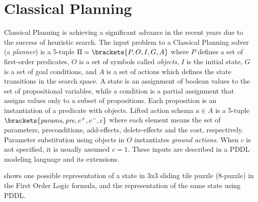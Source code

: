
\section{Classical Planning}

Classical Planning is achieving a significant advance in the recent years due to the success of heuristic search.
The input problem to a Classical Planning solver (a \emph{planner}) is a 5-tuple 
$\Pi=\brackets{P,O,I,G,A}$ where $P$ defines a set of first-order predicates, $O$ is a set of symbols called \emph{objects}, $I$ is the initial state, $G$ is a set of goal conditions, and $A$ is a set of actions which defines the state transitions in the search space.
A state is an assignment of boolean values to the set of propositional variables, while a condition is a partial assignment that assigns values only to a subset of propositions.
Each proposition is an instantiation of a predicate with objects.
% 
% 
Lifted action schema $a \in A$ is a 5-tuple
$\brackets{\mbox{\textit{params}}, \mbox{\textit{pre}}, e^+, e^-, c}$
where each element means the set of parameters, preconditions,
add-effects, delete-effects and the cost, respectively.
Parameter substitution using objects in $O$ instantiates \emph{ground actions}.
When $c$ is not specified, it is usually assumed $c=1$.
These inputs are described in a PDDL modeling language \cite{McDermott00} and its extensions.

 shows one possible representation of a state in
3x3 sliding tile puzzle (8-puzzle) in the First Order Logic formula, and the
representation of the same state using PDDL.

